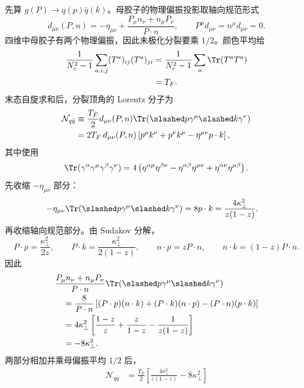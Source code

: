 \begin{derivation}
先算 $g(P)\to q(p)\bar q(k)$。母胶子的物理偏振投影取轴向规范形式
\begin{equation*}
 d_{\mu\nu}(P,n)
 =-\eta_{\mu\nu}
 +\frac{P_\mu n_\nu+n_\mu P_\nu}{P\cdot n},
 \qquad
 P^\mu d_{\mu\nu}=n^\mu d_{\mu\nu}=0.
\end{equation*}
四维中母胶子有两个物理偏振，因此未极化分裂要乘 $1/2$。颜色平均给
\begin{align*}
 \frac1{N_c^2-1}\sum_{a,i,j}
 (T^a)_{ij}(T^a)_{ji}
 &=\frac1{N_c^2-1}\sum_a\Tr(T^aT^a)\\
 &=T_F.
\end{align*}
末态自旋求和后，分裂顶角的 Lorentz 分子为
\begin{align*}
 \mathcal N_{q\bar q}
 &\equiv\frac{T_F}{2}
 d_{\mu\nu}(P,n)
 \Tr\!\left(\slashed p\gamma^\mu\slashed k\gamma^\nu\right)\\
 &=2T_F\,d_{\mu\nu}(P,n)
 \left[p^\mu k^\nu+p^\nu k^\mu
 -\eta^{\mu\nu}p\cdot k\right],
\end{align*}
其中使用
\begin{equation*}
 \Tr(\gamma^\alpha\gamma^\mu\gamma^\beta\gamma^\nu)
 =4\left(
 \eta^{\alpha\mu}\eta^{\beta\nu}
 -\eta^{\alpha\beta}\eta^{\mu\nu}
 +\eta^{\alpha\nu}\eta^{\mu\beta}
 \right).
\end{equation*}
先收缩 $-\eta_{\mu\nu}$ 部分：
\begin{align*}
 -\eta_{\mu\nu}
 \Tr(\slashed p\gamma^\mu\slashed k\gamma^\nu)
 &=8p\cdot k
 =\frac{4\kappa_\perp^2}{z(1-z)}.
\end{align*}
再收缩轴向规范部分。由 Sudakov 分解，
\begin{equation*}
 P\cdot p=\frac{\kappa_\perp^2}{2z},\qquad
 P\cdot k=\frac{\kappa_\perp^2}{2(1-z)},\qquad
 n\cdot p=zP\cdot n,\qquad
 n\cdot k=(1-z)P\cdot n.
\end{equation*}
因此
\begin{align*}
 &\frac{P_\mu n_\nu+n_\mu P_\nu}{P\cdot n}
 \Tr(\slashed p\gamma^\mu\slashed k\gamma^\nu)\\
 &\quad=\frac{8}{P\cdot n}
 \left[(P\cdot p)(n\cdot k)
 +(P\cdot k)(n\cdot p)
 -(P\cdot n)(p\cdot k)\right]\\
 &\quad=4\kappa_\perp^2
 \left[\frac{1-z}{z}+\frac{z}{1-z}
 -\frac1{z(1-z)}\right]\\
 &\quad=-8\kappa_\perp^2.
\end{align*}
两部分相加并乘母偏振平均 $1/2$ 后，
\begin{align*}
 \mathcal N_{q\bar q}
 &=\frac{T_F}{2}
 \left[
 \frac{4\kappa_\perp^2}{z(1-z)}
 -8\kappa_\perp^2
 \right]\\

\end{align*}
\end{derivation}
